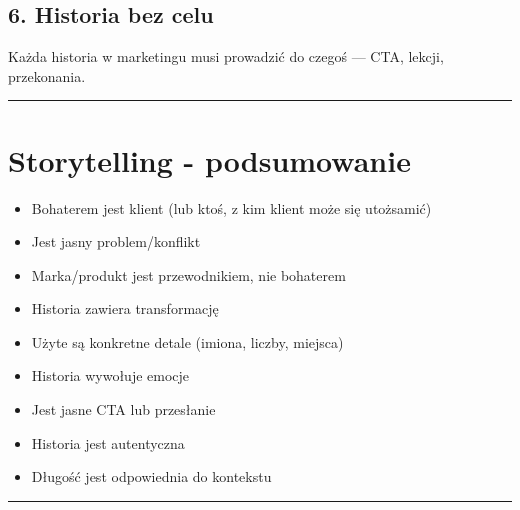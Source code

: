 \documentclass[
  12pt,
  a4paper,
  twoside,
  openright,
  12pt,
  DIV=12,
  BCOR=12mm]{scrbook}
\providecommand{\tightlist}{%
  \setlength{\itemsep}{0pt}\setlength{\parskip}{0pt}}\usepackage{longtable,booktabs,array}
\newcommand{\decoline}{%
  \begin{center}
    \textcolor{bordergray}{\rule{0.3\textwidth}{0.5pt}}
  \end{center}
}
\begin{document}
\subsection{6. Historia bez celu}\label{historia-bez-celu}

Każda historia w marketingu musi prowadzić do czegoś --- CTA, lekcji,
przekonania.

\decoline

\section{Storytelling - podsumowanie}\label{storytelling---podsumowanie}

\begin{itemize}
\tightlist
\item[$\square$]
  Bohaterem jest klient (lub ktoś, z kim klient może się utożsamić)
\item[$\square$]
  Jest jasny problem/konflikt
\item[$\square$]
  Marka/produkt jest przewodnikiem, nie bohaterem
\item[$\square$]
  Historia zawiera transformację
\item[$\square$]
  Użyte są konkretne detale (imiona, liczby, miejsca)
\item[$\square$]
  Historia wywołuje emocje
\item[$\square$]
  Jest jasne CTA lub przesłanie
\item[$\square$]
  Historia jest autentyczna
\item[$\square$]
  Długość jest odpowiednia do kontekstu
\end{itemize}

\decoline
\end{document}
